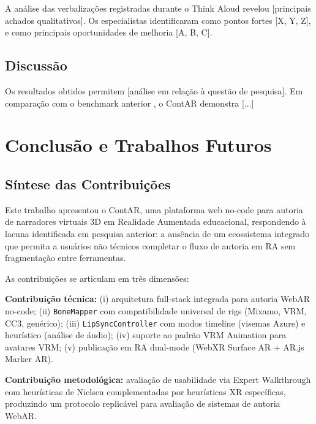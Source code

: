 \documentclass[
  12pt,
  openright,
  twoside,
  a4paper,
  english,
  brazil
]{abntex2}
\begin{document}
A análise das verbalizações registradas durante o Think Aloud revelou
[principais achados qualitativos]. Os especialistas identificaram como
pontos fortes [X, Y, Z], e como principais oportunidades de melhoria [A, B, C].

\section{Discussão}
\label{sec:discussao}

Os resultados obtidos permitem [análise em relação à questão de pesquisa].
Em comparação com o benchmark anterior \cite{freitas2025benchmark},
o ContAR demonstra [...]


\chapter{Conclusão e Trabalhos Futuros}
\label{cap:conclusao}

\section{Síntese das Contribuições}
\label{sec:contribuicoes}

Este trabalho apresentou o ContAR, uma plataforma web no-code para autoria
de narradores virtuais 3D em Realidade Aumentada educacional, respondendo
à lacuna identificada em pesquisa anterior: a ausência de um ecossistema
integrado que permita a usuários não técnicos completar o fluxo de autoria
em RA sem fragmentação entre ferramentas.

As contribuições se articulam em três dimensões:

\textbf{Contribuição técnica:} (i) arquitetura full-stack integrada para
autoria WebAR no-code; (ii) \texttt{BoneMapper} com compatibilidade
universal de rigs (Mixamo, VRM, CC3, genérico); (iii)
\texttt{LipSyncController} com modos timeline (visemas Azure) e heurístico
(análise de áudio); (iv) suporte ao padrão VRM Animation para avatares
VRM; (v) publicação em RA dual-mode (WebXR Surface AR + AR.js Marker AR).

\textbf{Contribuição metodológica:} avaliação de usabilidade via Expert
Walkthrough com heurísticas de Nielsen complementadas por heurísticas XR
específicas, produzindo um protocolo replicável para avaliação de sistemas
de autoria WebAR.
\end{document}
